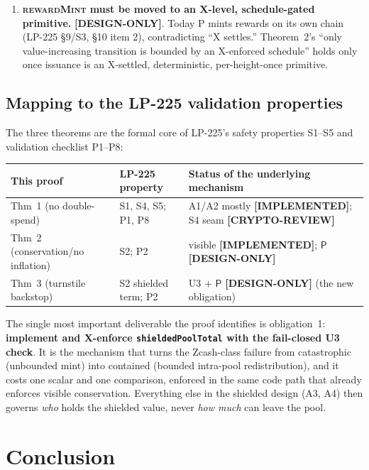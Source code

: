 \documentclass[11pt]{article}
\theoremstyle{definition}
\theoremstyle{remark}
\newcommand{\IMPL}{\textbf{[IMPLEMENTED]}}
\newcommand{\DESIGN}{\textbf{[DESIGN-ONLY]}}
\newcommand{\CRYPTO}{\textbf{[CRYPTO-REVIEW]}}
\newcommand{\pool}{\mathsf{P}}
\begin{document}
\begin{enumerate}[leftmargin=2em]
\item \textbf{\textsc{rewardMint} must be moved to an X-level,
  schedule-gated primitive.} \DESIGN{}. Today P mints rewards on its own
  chain (LP-225 \S9/S3, \S10 item 2), contradicting ``X settles.''
  Theorem~2's ``only value-increasing transition is bounded by an X-enforced
  schedule'' holds only once issuance is an X-settled, deterministic,
  per-height-once primitive.
\end{enumerate}

\subsection{Mapping to the LP-225 validation properties}

The three theorems are the formal core of LP-225's safety properties
S1--S5 and validation checklist P1--P8:

\begin{center}
\begin{tabular}{@{}l l p{4.6cm}@{}}
\toprule
This proof & LP-225 property & Status of the underlying mechanism \\
\midrule
Thm~1 (no double-spend)          & S1, S4, S5; P1, P8   & A1/A2 mostly \IMPL{}; S4 seam \CRYPTO{} \\
Thm~2 (conservation/no inflation)& S2; P2               & visible \IMPL{}; $\pool$ \DESIGN{} \\
Thm~3 (turnstile backstop)       & S2 shielded term; P2 & U3 $+$ $\pool$ \DESIGN{} (the new obligation) \\
\bottomrule
\end{tabular}
\end{center}

\noindent The single most important deliverable the proof identifies is
obligation~1: \textbf{implement and X-enforce \texttt{shieldedPoolTotal}
with the fail-closed U3 check}. It is the mechanism that turns the
Zcash-class failure from catastrophic (unbounded mint) into contained
(bounded intra-pool redistribution), and it costs one scalar and one
comparison, enforced in the same code path that already enforces visible
conservation. Everything else in the shielded design (A3, A4) then governs
\emph{who} holds the shielded value, never \emph{how much} can leave the
pool.

\section{Conclusion}
\label{sec:conclusion}
\end{document}
